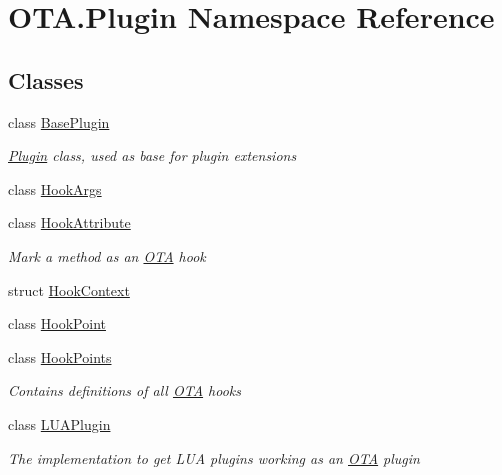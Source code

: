 \hypertarget{namespaceOTA_1_1Plugin}{}\section{O\+T\+A.\+Plugin Namespace Reference}
\label{namespaceOTA_1_1Plugin}
\subsection*{Classes}
\begin{DoxyCompactItemize}
\item 
class \hyperlink{classOTA_1_1Plugin_1_1BasePlugin}{Base\+Plugin}
\begin{DoxyCompactList}\small\item\em \hyperlink{namespaceOTA_1_1Plugin}{Plugin} class, used as base for plugin extensions \end{DoxyCompactList}\item 
class \hyperlink{classOTA_1_1Plugin_1_1HookArgs}{Hook\+Args}
\item 
class \hyperlink{classOTA_1_1Plugin_1_1HookAttribute}{Hook\+Attribute}
\begin{DoxyCompactList}\small\item\em Mark a method as an \hyperlink{namespaceOTA}{O\+T\+A} hook \end{DoxyCompactList}\item 
struct \hyperlink{structOTA_1_1Plugin_1_1HookContext}{Hook\+Context}
\item 
class \hyperlink{classOTA_1_1Plugin_1_1HookPoint}{Hook\+Point}
\item 
class \hyperlink{classOTA_1_1Plugin_1_1HookPoints}{Hook\+Points}
\begin{DoxyCompactList}\small\item\em Contains definitions of all \hyperlink{namespaceOTA}{O\+T\+A} hooks \end{DoxyCompactList}\item 
class \hyperlink{classOTA_1_1Plugin_1_1LUAPlugin}{L\+U\+A\+Plugin}
\begin{DoxyCompactList}\small\item\em The implementation to get L\+U\+A plugins working as an \hyperlink{namespaceOTA}{O\+T\+A} plugin \end{DoxyCompactList}\end{DoxyCompactItemize}
